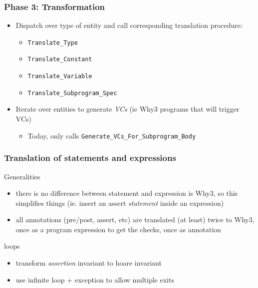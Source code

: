 \documentclass{beamer}
\newenvironment{specialframe}{%
  \begin{frame}[fragile,environment=specialframe]}{\end{frame}}
\begin{document}
\begin{specialframe}\frametitle{Phase 3: Transformation}
      \begin{itemize}
         \item Dispatch over type of entity and call corresponding translation
            procedure:
            \begin{itemize}
                  \item \verb|Translate_Type|
                  \item \verb|Translate_Constant|
                  \item \verb|Translate_Variable|
                  \item \verb|Translate_Subprogram_Spec|
            \end{itemize}
         \item Iterate over entities to generate \emph{VCs} (ie Why3 programs that
            will trigger VCs)
            \begin{itemize}
               \item Today, only calls \verb|Generate_VCs_For_Subprogram_Body|
            \end{itemize}
      \end{itemize}
\end{specialframe}

\begin{specialframe}\frametitle{Translation of statements and expressions}
   \begin{block}{Generalities}
      \begin{itemize}
         \item there is no difference between statement and expression is Why3,
               so this simplifies things (ie. insert an assert \emph{statement}
               inside an expression)
         \item all annotations (pre/post, assert, etc) are translated (at
least) twice to Why3, once as a program expression to get the checks, once as
annotation
      \end{itemize}

   \end{block}

   \begin{block}{loops}
      \begin{itemize}
         \item transform \emph{assertion} invariant to hoare invariant
         \item use infinite loop + exception to allow multiple exits
      \end{itemize}
   \end{block}

\end{specialframe}
\end{document}
